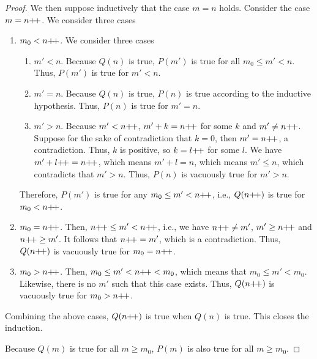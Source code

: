 \begin{proof}
    We then suppose inductively that the case $m=n$ holds. Consider the case $m=n{+}{\mkern-3mu}{+}$. We consider three cases
    \begin{enumerate}[label=(\arabic*)]
        \item $m_0<n{+}{\mkern-3mu}{+}$. We consider three cases
            \begin{enumerate}[label=(\roman*)]
                \item $m'<n$. Because $Q(n)$ is true, $P(m')$ is true for all $m_0 \leq m' < n$. Thus, $P(m')$ is true for $m'<n$.
                \item $m'=n$. Because $Q(n)$ is true, $P(n)$ is true according to the inductive hypothesis. Thus, $P(n)$ is true for $m'=n$.
                \item $m'>n$. Because $m'<n{+}{\mkern-3mu}{+}$, $m'+k=n{+}{\mkern-3mu}{+}$ for some $k$ and $m'\neq n{+}{\mkern-3mu}{+}$. Suppose for the sake of contradiction that $k=0$, then $m'=n{+}{\mkern-3mu}{+}$, a contradiction. Thus, $k$ is positive, so $k=l{+}{\mkern-3mu}{+}$ for some $l$. We have $m'+l{+}{\mkern-3mu}{+}=n{+}{\mkern-3mu}{+}$, which means $m'+l=n$, which means $m'\leq n$, which contradicts that $m'>n$. Thus, $P(n)$ is vacuously true for $m'>n$.
            \end{enumerate}
            Therefore, $P(m')$ is true for any $m_0 \leq m'<n{+}{\mkern-3mu}{+}$, i.e., $Q(n{+}{\mkern-3mu}{+})$ is true for $m_0<n{+}{\mkern-3mu}{+}$.
        \item $m_0=n{+}{\mkern-3mu}{+}$. Then, $n{+}{\mkern-3mu}{+}\leq m'< n{+}{\mkern-3mu}{+}$, i.e., we have $n{+}{\mkern-3mu}{+} \neq m'$, $m'\geq n{+}{\mkern-3mu}{+}$ and $n{+}{\mkern-3mu}{+} \geq m'$. It follows that $n{+}{\mkern-3mu}{+} = m'$, which is a contradiction. Thus, $Q(n{+}{\mkern-3mu}{+})$ is vacuously true for $m_0=n{+}{\mkern-3mu}{+}$.
        \item $m_0>n{+}{\mkern-3mu}{+}$. Then, $m_0 \leq m' < n{+}{\mkern-3mu}{+} <m_0$, which means that $m_0\leq m' < m_0$. Likewise, there is no $m'$ such that this case exists. Thus, $Q(n{+}{\mkern-3mu}{+})$ is vacuously true for $m_0>n{+}{\mkern-3mu}{+}$.
    \end{enumerate}
    Combining the above cases, $Q(n{+}{\mkern-3mu}{+})$ is true when $Q(n)$ is true. This closes the induction.

    Because $Q(m)$ is true for all $m\geq m_0$, $P(m)$ is also true for all $m\geq m_0$.
\end{proof}

